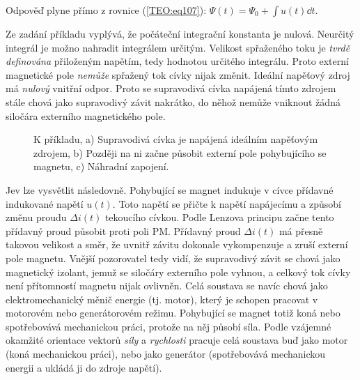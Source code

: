     Odpověď plyne přímo z rovnice (\ref{TEO:eq107}): \(\Psi(t) = \Psi_0 +\int u(t)\dd{t}\).
    
    Ze zadání příkladu vyplývá, že počáteční integrační konstanta je nulová. Neurčitý integrál je
    možno nahradit integrálem určitým. Velikost spřaženého toku je \emph{tvrdě definována}
    přiloženým napětím, tedy hodnotou určitého integrálu. Proto externí magnetické pole 
    \emph{nemůže} spřažený tok cívky nijak změnit. Ideální napěťový zdroj má \emph{nulový} 
    vnitřní odpor. Proto se supravodivá cívka napájená tímto zdrojem stále chová jako supravodivý
    závit nakrátko, do něhož nemůže vniknout žádná siločára externího magnetického pole.
    
    \begin{figure}[ht!]
      \centering  
      \hspace{1em}
      \newline               
      \caption{K příkladu, a) Supravodivá cívka je napájená ideálním napěťovým zdrojem, b) Později
               na ni začne působit externí pole pohybujícího se magnetu, c) Náhradní zapojení.} 
      \label{teo:fig042}
    \end{figure}
  
    Jev lze vysvětlit následovně. Pohybující se magnet indukuje v cívce přídavné indukované napětí
    \(u(t)\). Toto napětí se přičte k napětí napájecímu a způsobí změnu proudu \(\Delta i(t)\)
    tekoucího cívkou. Podle Lenzova principu začne tento přídavný proud působit proti poli PM.
    Přídavný proud \(\Delta i(t)\) má přesně takovou velikost a směr, že uvnitř závitu dokonale
    vykompenzuje a zruší externí pole magnetu. Vnější pozorovatel tedy vidí, že supravodivý závit se
    chová jako magnetický izolant, jemuž se siločáry externího pole vyhnou, a celkový tok cívky není
    přítomností magnetu nijak ovlivněn. Celá soustava se navíc chová jako elektromechanický měnič
    energie (tj. motor), který je schopen pracovat v motorovém nebo generátorovém režimu. Pohybující
    se magnet totiž koná nebo spotřebovává mechanickou práci, protože na něj působí síla. Podle
    vzájemné okamžité orientace vektorů \emph{síly} a \emph{rychlosti} pracuje celá soustava buď
    jako motor (koná mechanickou práci), nebo jako generátor (spotřebovává mechanickou energii a
    ukládá ji do zdroje napětí).

